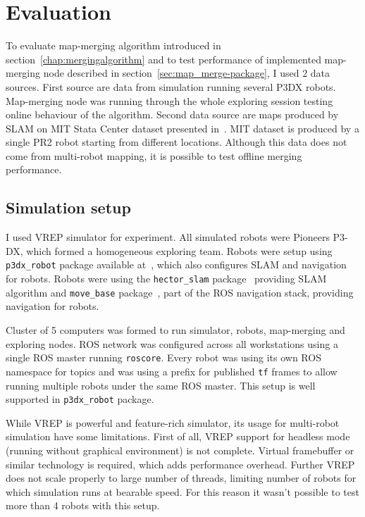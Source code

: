 \chapter{Evaluation}
\label{chap:evaluation}

To evaluate map-merging algorithm introduced in section~\ref{chap:mergingalgorithm} and to test performance of implemented map-merging node described in section~\ref{sec:map_merge-package}, I used $2$ data sources. First source are data from  simulation running several P3DX robots. Map-merging node was running through the whole exploring session testing online behaviour of the algorithm. Second data source are maps produced by \gls{SLAM} on \gls{MIT} Stata Center dataset presented in~\cite{Fallon2013}. \gls{MIT} dataset is produced by a single PR2 robot starting from different locations. Although this data does not come from multi-robot mapping, it is possible to test offline merging performance.

\section{Simulation setup}

I used \gls{VREP} simulator for experiment. All simulated robots were Pioneers P3-DX, which formed a homogeneous exploring team. Robots were setup using \texttt{p3dx\_robot} package available at~\cite{GitHubRoboRescue}, which also configures \gls{SLAM} and navigation for robots. Robots were using the \texttt{hector\_slam} package~\cite{2013:RoboCup} providing \gls{SLAM} algorithm and \texttt{move\_base} package~\cite{Marder2016}, part of the \gls{ROS} navigation stack, providing navigation for robots.

Cluster of 5 computers was formed to run simulator, robots, map-merging and exploring nodes. \gls{ROS} network was configured across all workstations using a single \gls{ROS} master running \texttt{roscore}. Every robot was using its own \gls{ROS} namespace for topics and was using a prefix for published \texttt{tf} frames to allow running multiple robots under the same \gls{ROS} master. This setup is well supported in \texttt{p3dx\_robot} package.

While \gls{VREP} is powerful and feature-rich simulator, its usage for multi-robot simulation have some limitations. First of all, \gls{VREP} support for headless mode (running without graphical environment) is not complete. Virtual framebuffer or similar technology is required, which adds performance overhead. Further \gls{VREP} does not scale properly to large number of threads, limiting number of robots for which simulation runs at bearable speed. For this reason it wasn't possible  to test more than 4 robots with this setup.

